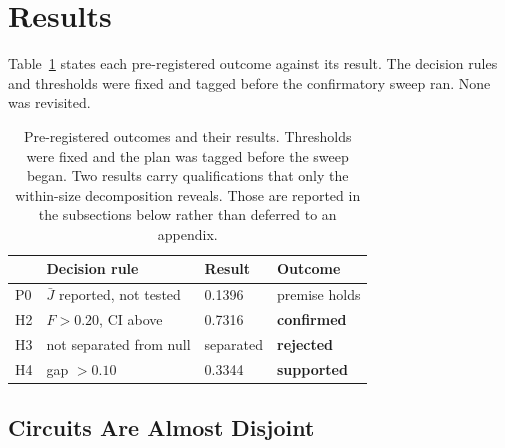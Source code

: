 \documentclass[letterpaper]{article} %
\begin{document}
%
\section{Results}

Table~\ref{tab:hyp} states each pre-registered outcome against its result. The
decision rules and thresholds were fixed and tagged before the confirmatory
sweep ran. None was revisited.

\begin{table}[t]
\centering
\caption{Pre-registered outcomes and their results. Thresholds were fixed and
the plan was tagged before the sweep began. Two results carry qualifications
that only the within-size decomposition reveals. Those are reported in the
subsections below rather than deferred to an appendix.}
\label{tab:hyp}
\small\setlength{\tabcolsep}{4pt}
\begin{tabular}{llll}
\toprule
& Decision rule & Result & Outcome \\
\midrule
P0 & $\bar{J}$ reported, not tested & 0.1396 & premise holds \\
H2 & $F > 0.20$, CI above & 0.7316 & \textbf{confirmed} \\
H3 & not separated from null & separated & \textbf{rejected} \\
H4 & gap $> 0.10$ & 0.3344 & \textbf{supported} \\
\bottomrule
\end{tabular}
\end{table}

\subsection{Circuits Are Almost Disjoint}
\end{document}
